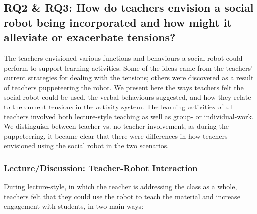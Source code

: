 \subsection{\textbf{RQ2 \& RQ3: How do teachers envision a social robot being incorporated and how might it alleviate or exacerbate tensions?}}
\label{sec:16}


The teachers envisioned various functions and behaviours a social robot could perform to support learning activities.  Some of the ideas came from the teachers' current strategies for dealing with the tensions; others were discovered as a result of teachers puppeteering the robot. We present here the ways teachers felt the social robot could be used, the verbal behaviours suggested, and how they relate to the current tensions in the activity system.  The learning activities of all teachers involved both lecture-style teaching as well as group- or individual-work. We distinguish between teacher vs. no teacher involvement, as during the puppeteering, it became clear that there were differences in how teachers envisioned using the social robot in the two scenarios. 


\subsubsection{Lecture/Discussion: Teacher-Robot Interaction}
\label{sec:17}
During lecture-style, in which the teacher is addressing the class as a whole, teachers felt that they could use the robot to teach the material and increase engagement with students, in two main ways:\\

